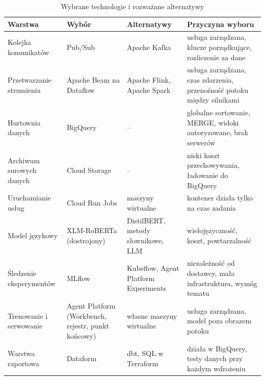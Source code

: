 \begin{table}[hbp]
  \caption{Wybrane technologie i rozważane alternatywy}
  \label{tab:tech-summary}
  \centering
  \small
  \begin{tabular}{|p{}|p{}|p{}|p{}|}
    \hline
    Warstwa                  & Wybór                                   & Alternatywy                  & Przyczyna wyboru                                                                     \\
    \hline
    Kolejka komunikatów      & Pub/Sub                                 & Apache Kafka                 & usługa zarządzana, klucze porządkujące, rozliczenie za dane                          \\
    \hline
    Przetwarzanie strumienia & Apache Beam na Dataflow                 & Apache Flink, Apache Spark   & usługa zarządzana, czas zdarzenia, przenośność potoku między silnikami               \\
    \hline
    Hurtownia danych         & BigQuery                                & --                           & globalne sortowanie, MERGE, widoki autoryzowane, brak serwerów                       \\
    \hline
    Archiwum surowych danych & Cloud Storage                           & --                           & niski koszt przechowywania, ładowanie do BigQuery                                    \\
    \hline
    Uruchamianie usług       & Cloud Run Jobs                          & maszyny wirtualne            & kontener działa tylko na czas zadania                                                \\
    \hline
    Model językowy           & XLM-RoBERTa (dostrojony)                & DistilBERT, metody słownikowe, LLM & wielojęzyczność, koszt, powtarzalność                                            \\
    \hline
    Śledzenie eksperymentów  & MLflow                                  & Kubeflow, Agent Platform Experiments & niezależność od dostawcy, mała infrastruktura, wymóg tematu                       \\
    \hline
    Trenowanie i serwowanie  & Agent Platform (Workbench, rejestr, punkt końcowy) & własne maszyny wirtualne & usługa zarządzana, model poza obrazem potoku                                       \\
    \hline
    Warstwa raportowa        & Dataform                                & dbt, SQL w Terraform         & działa w BigQuery, testy danych przy każdym wdrożeniu                                \\

\end{tabular}
\end{table}
